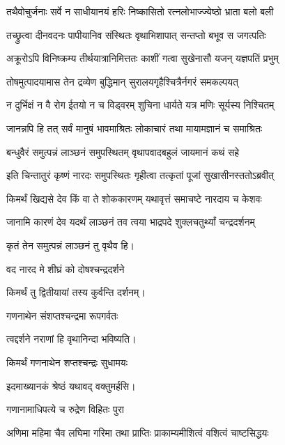 \begin{center}
\twolineshloka
{तथैवोचुर्जनाः सर्वे न साधीयानयं हरिः}
{निष्कासितो रत्नलोभाज्ज्येष्ठो भ्राता बलो बली}%

\twolineshloka
{तच्छ्रुत्वा दीनवदनः पापीयानिव संस्थितः}
{वृथाभिशापात् सन्तप्तो बभूव स जगत्पतिः}%

\twolineshloka
{अक्रूरोऽपि विनिष्क्रम्य तीर्थयात्रानिमित्ततः}
{काशीं गत्वा सुखेनासौ यजन् यज्ञपतिं प्रभुम्}%

\twolineshloka
{तोषमुत्पादयामास तेन द्रव्येण बुद्धिमान्}
{सुरालयगृहैश्चित्रैर्नगरं समकल्पयत्}%

\twolineshloka
{न दुर्भिक्षं न वै रोग ईतयो न च विड्वरम्}
{शुचिना धार्यते यत्र मणिः सूर्यस्य निश्चितम्}%

\twolineshloka
{जानन्नपि हि तत् सर्वं मानुषं भावमाश्रितः}
{लोकाचारं तथा मायामज्ञानं च समाश्रितः}%

\twolineshloka
{बन्धुवैरं समुत्पन्नं लाञ्छनं समुपस्थितम्}
{वृथापवादबहुलं जायमानं कथं सहे}%

\twolineshloka
{इति चिन्तातुरं कृष्णं नारदः समुपस्थितः}
{गृहीत्वा तत्कृतां पूजां सुखासीनस्ततोऽब्रवीत्}%


\twolineshloka
{किमर्थं खिद्यसे देव किं वा ते शोककारणम्}
{यथावृत्तं समाचष्टे नारदाय च केशवः}%


\twolineshloka
{जानामि कारणं देव यदर्थं लाञ्छनं तव}
{त्वया भाद्रपदे शुक्लचतुर्थ्यां चन्द्रदर्शनम्}%

{कृतं तेन समुत्पन्नं लाञ्छनं तु वृथैव हि।}


\onelineshloka
{वद नारद मे शीघ्रं को दोषश्चन्द्रदर्शने}%

{किमर्थं तु द्वितीयायां तस्य कुर्वन्ति दर्शनम्।}


\onelineshloka
{गणनाथेन संशप्तश्चन्द्रमा रूपगर्वतः}%

{त्वद्दर्शने नराणां हि वृथानिन्दा भविष्यति।}

\onelineshloka
{किमर्थं गणनाथेन शप्तश्चन्द्रः सुधामयः}%

{इदमाख्यानकं श्रेष्ठं यथावद् वक्तुमर्हसि।} 

\onelineshloka
{गणानामाधिपत्ये च रुद्रेण विहितः पुरा}%

\twolineshloka
{अणिमा महिमा चैव लघिमा गरिमा तथा}
{प्राप्तिः प्राकाम्यमीशित्वं वशित्वं चाष्टसिद्धयः}%


\end{center}
